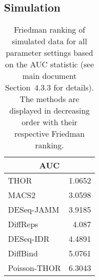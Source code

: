 \subsection{Simulation}
\begin{table}[h!]
\begin{center}
\renewcommand{\arraystretch}{1.2}
  \begin{tabular}{ |lr| }
    \hline
    \multicolumn{2}{|c|}{\textbf{AUC}} \\
    \hline
    THOR & 1.0652 \\
    MACS2 & 3.0598 \\
    DESeq-JAMM & 3.9185 \\
    DiffReps & 4.087 \\
    DESeq-IDR & 4.4891 \\
    DiffBind & 5.0761 \\
    Poisson-THOR & 6.3043 \\
    \hline
  \end{tabular}
\end{center}
\caption[Friedman ranking of simulated data with replicates]{Friedman ranking of simulated data for all parameter settings based on the AUC statistic (see main document Section~4.3.3 for details). The methods are displayed in decreasing order with their respective Friedman ranking.}
\label{tab_res_with_rep_sim_all}
\end{table}


